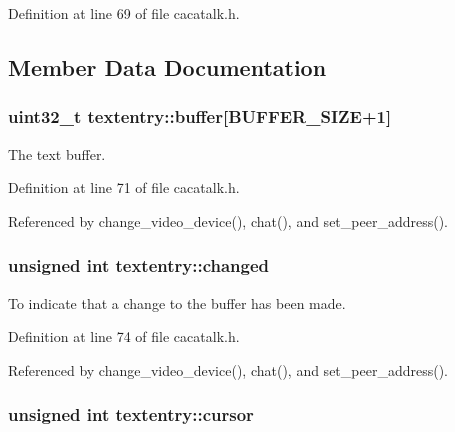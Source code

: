 \-Definition at line 69 of file cacatalk.\-h.



\subsection{\-Member \-Data \-Documentation}
\hypertarget{structtextentry_aa504334ee4b52796c93d25e10784d29e}{
\subsubsection[{buffer}]{\setlength{\rightskip}{0pt plus 5cm}uint32\-\_\-t {\bf textentry\-::buffer}\mbox{[}{\bf \-B\-U\-F\-F\-E\-R\-\_\-\-S\-I\-Z\-E}+1\mbox{]}}}\label{structtextentry_aa504334ee4b52796c93d25e10784d29e}


\-The text buffer. 



\-Definition at line 71 of file cacatalk.\-h.



\-Referenced by change\-\_\-video\-\_\-device(), chat(), and set\-\_\-peer\-\_\-address().

\hypertarget{structtextentry_a5af018f6c56b4ae3f60674c70226cec7}{
\subsubsection[{changed}]{\setlength{\rightskip}{0pt plus 5cm}unsigned int {\bf textentry\-::changed}}}\label{structtextentry_a5af018f6c56b4ae3f60674c70226cec7}


\-To indicate that a change to the buffer has been made. 



\-Definition at line 74 of file cacatalk.\-h.



\-Referenced by change\-\_\-video\-\_\-device(), chat(), and set\-\_\-peer\-\_\-address().

\hypertarget{structtextentry_a61cdc6b8c0bede44adf1f61fa347e7bc}{
\subsubsection[{cursor}]{\setlength{\rightskip}{0pt plus 5cm}unsigned int {\bf textentry\-::cursor}}}\label{structtextentry_a61cdc6b8c0bede44adf1f61fa347e7bc}


